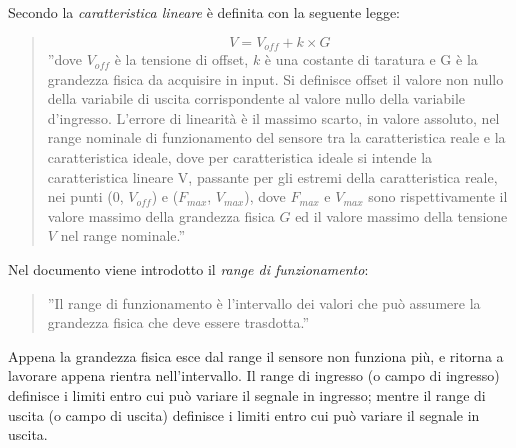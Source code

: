 \documentclass[a4paper]{report} %
\begin{document}
Secondo \cite{art:rif.1} la \textit{caratteristica lineare} è definita con la seguente legge: 
\begin{quote}
	\begin{equation}
	V = V_{off} + k \times G
	\end{equation}
	''dove $V_{off}$ è la tensione di offset, $k$ è una costante di taratura e G è la grandezza fisica da acquisire in input. Si definisce offset il valore non nullo della variabile di uscita corrispondente al valore nullo della variabile d'ingresso.
	L'errore di linearità è il massimo scarto, in valore assoluto, nel range nominale di funzionamento del sensore tra la caratteristica reale e la caratteristica ideale, dove per caratteristica ideale si intende la caratteristica lineare V, passante per gli estremi della caratteristica reale, nei punti (0, $V_{off}$) e ($F_{max}$, $V_{max}$), dove $F_{max}$ e $V_{max}$ sono rispettivamente il valore massimo della grandezza fisica $G$ ed il valore massimo della tensione $V$ nel range nominale.''
\end{quote}

Nel documento \cite{art:rif.11} viene introdotto il \textit{range di funzionamento}:
\begin{quote}
	''Il range di funzionamento è l'intervallo dei valori che può assumere la grandezza fisica che deve essere trasdotta.'' 
\end{quote}  	
Appena la grandezza fisica esce dal range il sensore non funziona più, e ritorna a lavorare appena rientra nell'intervallo. Il range di ingresso (o campo di ingresso) definisce i limiti entro cui può variare il segnale in ingresso; mentre il range di uscita (o campo di uscita) definisce i limiti entro cui può variare il segnale in uscita.
 
\end{document}
